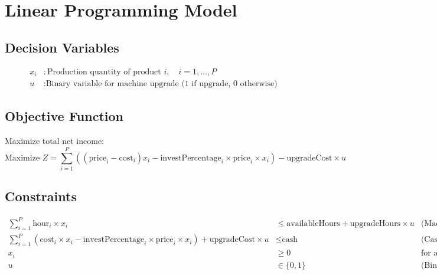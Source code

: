 \documentclass{article}
\begin{document}
\section*{Linear Programming Model}

\subsection*{Decision Variables}
\begin{align*}
x_i & : \text{Production quantity of product } i, \quad i = 1, \ldots, P \\
u & : \text{Binary variable for machine upgrade (1 if upgrade, 0 otherwise)}
\end{align*}

\subsection*{Objective Function}
Maximize total net income:
\[
\text{Maximize } Z = \sum_{i=1}^{P} \left( (\text{price}_i - \text{cost}_i) x_i - \text{investPercentage}_i \times \text{price}_i \times x_i \right) - \text{upgradeCost} \times u
\]

\subsection*{Constraints}
\begin{align*}
\sum_{i=1}^{P} \text{hour}_i \times x_i & \leq \text{availableHours} + \text{upgradeHours} \times u & \text{(Machine capacity constraint)} \\
\sum_{i=1}^{P} (\text{cost}_i \times x_i - \text{investPercentage}_i \times \text{price}_i \times x_i) + \text{upgradeCost} \times u & \leq \text{cash} & \text{(Cash availability constraint)} \\
x_i & \geq 0 & \text{for all } i \\
u & \in \{0, 1\} & \text{(Binary constraint)}
\end{align*}
\end{document}
